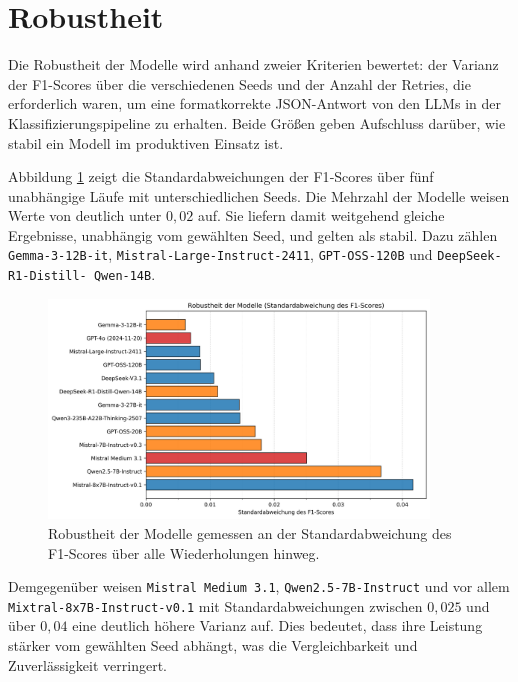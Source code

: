 \section{Robustheit}\label{sec:robustheit}

Die Robustheit der Modelle wird anhand zweier Kriterien bewertet: der Varianz der F1-Scores über die verschiedenen Seeds und der Anzahl der Retries, die erforderlich waren, um eine formatkorrekte JSON-Antwort von den \acp{LLM} in der Klassifizierungspipeline zu erhalten. Beide Größen geben Aufschluss darüber, wie stabil ein Modell im produktiven Einsatz ist.

Abbildung \ref{fig:results-evaluation-robustness-f1-std} zeigt die Standardabweichungen der F1‑Scores über fünf unabhängige Läufe mit unterschiedlichen Seeds. Die Mehrzahl der Modelle weisen Werte von deutlich unter $0{,}02$ auf. Sie liefern damit weitgehend gleiche Ergebnisse, unabhängig vom gewählten Seed, und gelten als stabil. Dazu zählen \texttt{Gemma-3-12B-it}, \texttt{Mistral-Large-Instruct-2411}, \texttt{GPT-OSS-120B} und \texttt{DeepSeek-R1-Distill-\linebreak~Qwen-14B}.

\begin{figure}[htbp]
    \centering
    \includegraphics[width=0.9\textwidth]{images/results/evaluation_robustness_f1_std}
    \caption{Robustheit der Modelle gemessen an der Standardabweichung des F1-Scores über alle Wiederholungen hinweg.}
    \label{fig:results-evaluation-robustness-f1-std}
\end{figure}

Demgegenüber weisen \texttt{Mistral Medium 3.1}, \texttt{Qwen2.5-7B-Instruct} und vor allem \texttt{Mixtral-8x7B-Instruct-v0.1} mit Standardabweichungen zwischen $0{,}025$ und über $0{,}04$ eine deutlich höhere Varianz auf. Dies bedeutet, dass ihre Leistung stärker vom gewählten Seed abhängt, was die Vergleichbarkeit und Zuverlässigkeit verringert.

